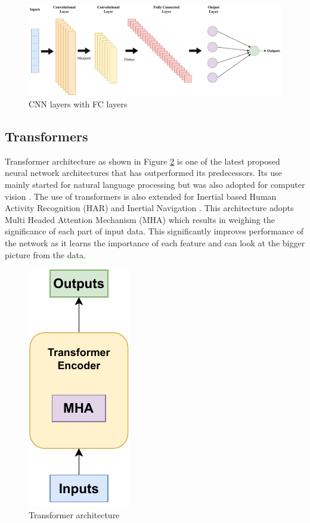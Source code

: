 \begin{figure}[H]
    \centering
    \includegraphics[scale=0.55]{images/fig_chapter2/nns/cnn_mlp.pdf}
    \caption{CNN layers with FC layers}
    \label{fig:cnn_fc}
\end{figure}

\subsection{Transformers}
Transformer architecture as shown in Figure \ref{fig:transformer_arch} is one of the latest proposed neural network architectures that has outperformed its predecessors. Its use mainly started for natural language processing \citep{vaswani2017attention} but was also adopted for computer vision \citep{dosovitskiy2020image}. The use of transformers is also extended for Inertial based Human Activity Recognition (HAR) \cite{shavit2021boosting} and Inertial Navigation \citep{rao2022ctin}. This architecture adopts Multi Headed Attention Mechanism (MHA) \citep{vaswani2017attention} which results in weighing the significance of each part of input data. This significantly improves performance of the network as it learns the importance of each feature and can look at the bigger picture from the data.

\begin{figure}[H]
    \centering
    \includegraphics[scale=1]{images/fig_chapter2/nns/transformer_arch.pdf}
    \caption{Transformer architecture}
    \label{fig:transformer_arch}
\end{figure}

